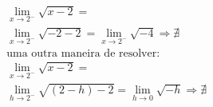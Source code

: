 \begin{ex}
\begin{align}
&\lim_{x\rightarrow 2^-} \sqrt{x-2}=\nonumber\\
&\lim_{x\rightarrow 2^-} \sqrt{-2-2}=\lim_{x\rightarrow 2^-} \sqrt{-4}\Rightarrow\nexists\nonumber\\
&\text{uma outra maneira de resolver:}\nonumber\\
&\lim_{x\rightarrow 2^-} \sqrt {x-2}=\nonumber\\
&\lim_{h\rightarrow 2^-} \sqrt{(2-h)-2}=\lim_{h\rightarrow 0} \sqrt{-h}\Rightarrow\nexists\nonumber
\end{align}
\end{ex}